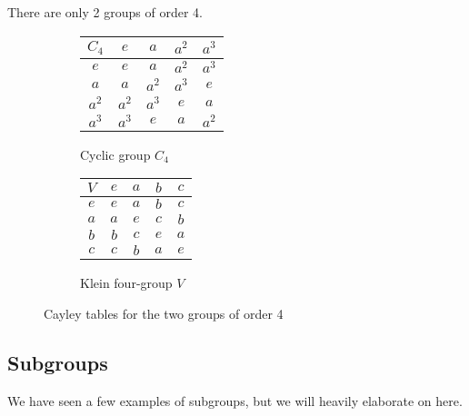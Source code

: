   \begin{example}
    There are only 2 groups of order 4. 
    \begin{figure}[H]
      \centering
      \begin{subfigure}[b]{0.48\textwidth}
        \centering
        \begin{tabular}{|c|c|c|c|c|}
          \hline
          $C_4$ & $e$ & $a$ & $a^2$ & $a^3$ \\
          \hline
          $e$ & $e$ & $a$ & $a^2$ & $a^3$ \\
          \hline
          $a$ & $a$ & $a^2$ & $a^3$ & $e$ \\
          \hline
          $a^2$ & $a^2$ & $a^3$ & $e$ & $a$ \\
          \hline
          $a^3$ & $a^3$ & $e$ & $a$ & $a^2$ \\
          \hline
        \end{tabular}
        \caption{Cyclic group $C_4$}
      \end{subfigure}
      \hfill 
      \begin{subfigure}[b]{0.48\textwidth}
        \centering
        \begin{tabular}{|c|c|c|c|c|}
          \hline
          $V$ & $e$ & $a$ & $b$ & $c$ \\
          \hline
          $e$ & $e$ & $a$ & $b$ & $c$ \\
          \hline
          $a$ & $a$ & $e$ & $c$ & $b$ \\
          \hline
          $b$ & $b$ & $c$ & $e$ & $a$ \\
          \hline
          $c$ & $c$ & $b$ & $a$ & $e$ \\
          \hline
        \end{tabular}
        \caption{Klein four-group $V$}
      \end{subfigure}
      \caption{Cayley tables for the two groups of order 4}
      \label{fig:order4groups}
    \end{figure} 
  \end{example}

\subsection{Subgroups}

  We have seen a few examples of subgroups, but we will heavily elaborate on here. 

